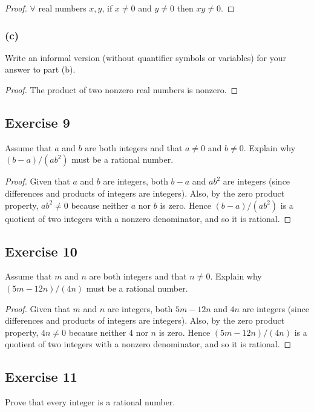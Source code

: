 \documentclass[14pt]{extarticle}
\newcommand{\fa}{\forall}
\begin{document}
\begin{proof}
    $\fa$ real numbers $x, y$, if $x \neq 0$ and $y \neq 0$ then $xy \neq 0$.
\end{proof}

\subsubsection{(c)}
Write an informal version (without quantifier symbols or variables) for your answer to part (b).

\begin{proof}
    The product of two nonzero real numbers is nonzero.
\end{proof}

\subsection{Exercise 9}
Assume that $a$ and $b$ are both integers and that $a \neq 0$ and $b \neq 0$. Explain why $(b - a)/(ab^2)$ must be a rational number.

\begin{proof}
    Given that $a$ and $b$ are integers, both $b - a$ and $ab^2$ are integers (since differences and products of integers are integers). Also, by the zero product property, $ab^2 \neq 0$ because neither $a$ nor $b$ is zero. Hence $(b - a)/(ab^2)$ is a quotient of two integers with a nonzero denominator, and so it is rational.
\end{proof}

\subsection{Exercise 10}
Assume that $m$ and $n$ are both integers and that $n \neq 0$. Explain why $(5m - 12n)/(4n)$ must be a rational number.

\begin{proof}
    Given that $m$ and $n$ are integers, both $5m - 12n$ and $4n$ are integers (since differences and products of integers are integers). Also, by the zero product property, $4n \neq 0$ because neither $4$ nor $n$ is zero. Hence $(5m - 12n)/(4n)$ is a quotient of two integers with a nonzero denominator, and so it is rational.
\end{proof}

\subsection{Exercise 11}
Prove that every integer is a rational number.
\end{document}
